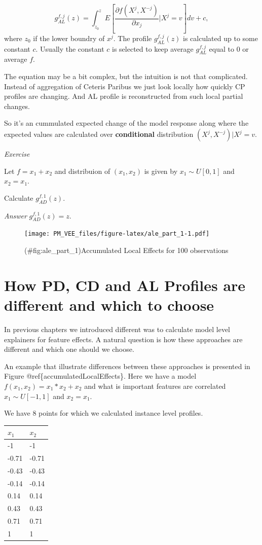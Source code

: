 \documentclass[12pt,]{krantz}
\theoremstyle{definition}
\theoremstyle{definition}
\theoremstyle{definition}
\theoremstyle{remark}
\begin{document}
\[
g_{AL}^{f, j}(z) = \int_{z_0}^z E\left[\frac{\partial f(X^j, X^{-j})}{\partial x_j}|X^j = v\right] dv + c,
\] where \(z_0\) if the lower boundry of \(x^j\). The profile
\(g_{AL}^{f, j}(z)\) is calculated up to some constant \(c\). Usually
the constant \(c\) is selected to keep average \(g_{AL}^{f, j}\) equal
to 0 or average \(f\).

The equation may be a bit complex, but the intuition is not that
complicated. Instead of aggregation of Ceteris Paribus we just look
locally how quickly CP profiles are changing. And AL profile is
reconstructed from such local partial changes.

So it's an cummulated expected change of the model response along where
the expected values are calculated over \textbf{conditional}
distribution \((X^j,X^{-j})|X^j=v\).

\emph{Exercise}

Let \(f = x_1 + x_2\) and distribuion of \((x_1, x_2)\) is given by
\(x_1 \sim U[0,1]\) and \(x_2=x_1\).

Calculate \(g_{AD}^{f, 1}(z)\).

\emph{Answer} \(g_{AD}^{f, 1}(z) = z\).

\begin{figure}
\centering
\texttt{[image: PM\_VEE\_files/figure-latex/ale\_part\_1-1.pdf]}
\caption{(\#fig:ale\_part\_1)Accumulated Local Effects for 100
observations}
\end{figure}

\hypertarget{how-pd-cd-and-al-profiles-are-different-and-which-to-choose}{%
\section{How PD, CD and AL Profiles are different and which to
choose}\label{how-pd-cd-and-al-profiles-are-different-and-which-to-choose}}

In previous chapters we introduced different was to calculate model
level explainers for feature effects. A natural question is how these
approaches are different and which one should we choose.

An example that illustrate differences between these approaches is
presented in Figure @ref\{accumulatedLocalEffects\}. Here we have a
model \(f(x_1, x_2) = x_1*x_2 + x_2\) and what is important features are
correlated \(x_1 \sim U[-1,1]\) and \(x_2 = x_1\).

We have 8 points for which we calculated instance level profiles.

\begin{longtable}[]{@{}ll@{}}
\toprule
\(x_1\) & \(x_2\)\tabularnewline
\midrule
\endhead
-1 & -1\tabularnewline
-0.71 & -0.71\tabularnewline
-0.43 & -0.43\tabularnewline
-0.14 & -0.14\tabularnewline
0.14 & 0.14\tabularnewline
0.43 & 0.43\tabularnewline
0.71 & 0.71\tabularnewline
1 & 1\tabularnewline
\bottomrule
\end{longtable}
\end{document}
